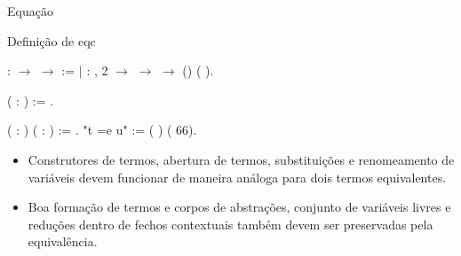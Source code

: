 \documentclass{beamer}
\begin{document}
\begin{frame}{Equação}

    \begin{block}{Definição de eqc}
        
    \coqdocnoindent {}  : 
    \ensuremath{\rightarrow}  \ensuremath{\rightarrow}
     := \coqdoceol \coqdocindent{1.00em} \ensuremath{|}
    :
    \coqdockw{\ensuremath{\forall}}   ,
     2  \ensuremath{\rightarrow}
      \ensuremath{\rightarrow}
      \ensuremath{\rightarrow}
    (\coqdocnotation{[}\coqdocnotation{][}\coqdocnotation{]})
    (\coqdocnotation{(}\coqdocnotation{\&}
    \coqdocnotation{)[}\coqdocnotation{][}\coqdocnotation{]}).\coqdoceol


    \bigskip {}  (
    : ) :=
      
    .

     
    ( : ) ( :
    ) :=   
    .\coqdoceol {} "t =e u" := (  ) (
 66).\coqdoceol
    \end{block}

    \pause

\begin{itemize}
    \item Construtores de termos, abertura de termos, substituições e
        renomeamento de variáveis devem funcionar de maneira análoga para dois
        termos equivalentes.
    \item Boa formação de termos e corpos de abstrações, conjunto de variáveis
        livres e reduções dentro de fechos contextuais também devem ser
        preservadas pela equivalência.
\end{itemize}
    
\end{frame}
\end{document}
